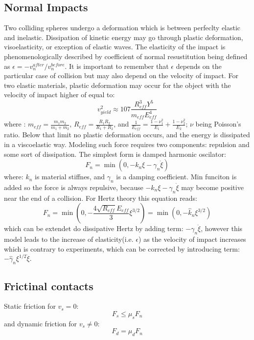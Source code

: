 \documentclass[10pt,a4paper]{article}
\begin{document}
\subsection{Normal Impacts}
Two colliding spheres undergo a deformation which is between perfeclty elastic and inelastic. Dissipation of kinetic energy may go through
plastic deformation, visoelasticity, or exception of elastic waves. 
The elasticity of the impact is 
phenomenologically described by coefficient of normal resustitution being defined as $\epsilon = -v^{after}_n/v^{before}_n$. It is important
to remember that $\epsilon$ depends on the particular case of collision but may also depend on the velocity of impact.
For two elastic materials, plastic deformation may occur for the object with the velocity of impact higher of equal to:
\begin{equation}
 v^2_{yield} \approx 107 \frac{R^3_{eff} Y^5}{m_{eff} E^4_{eff}}
\end{equation}
where : $m_{eff} = \frac{m_1m_2}{m_1 + m_2}$, $R_{eff} = \frac{R_1R_2}{R_1 + R_2}$, and $\frac{1}{E_{eff}} = \frac{1-\nu^2_1}{E_1} +\frac{1-\nu^2_2}{E_2}$; 
$\nu$ being Poisson's ratio. Below that limit no plastic deformation occurs, and the energy is dissipated in a viscoelastic way.
Modeling such force requires two components: repulsion and some sort of dissipation. The simplest form is damped harmonic oscilator:
\begin{equation}
 F_{n} = \min(0,-k_n\xi - \gamma_n \dot{\xi})
\end{equation}
where: $k_n$ is material stiffnes, and $\gamma_n$ is a damping coefficient. Min funciton is added so the force is always repulsive,
because $-k_n\xi - \gamma_n \dot{\xi}$ may become positive near the end of a collision.
For Hertz theory this equation reads:
\begin{equation}
 F_{n} = \min \left(0, -\frac{4 \sqrt{R_{eff}} E_{eff}}{3} \xi^{3/2} \right)  =  \min(0, -\hat{k}_{n}\xi^{3/2})
\end{equation}
which can be extendet do dissipative Hertz by adding term: $- \gamma_n \dot{\xi}$, however this model leads to the increase of
elasticity(i.e. $\epsilon$) as the velocity of impact increases which is contrary to experiments, which can be corrected by 
introducing term: $ -\hat{\gamma}_n \xi^{1/2} \dot{\xi}$.



\subsection{Frictinal contacts}
Static friction for $v_s = 0$:
\[
 F_s \le \mu_s F_n
\]
and dynamic friction for $v_s \ne 0$:
\[
 F_d = \mu_d F_n
\]
\end{document}
